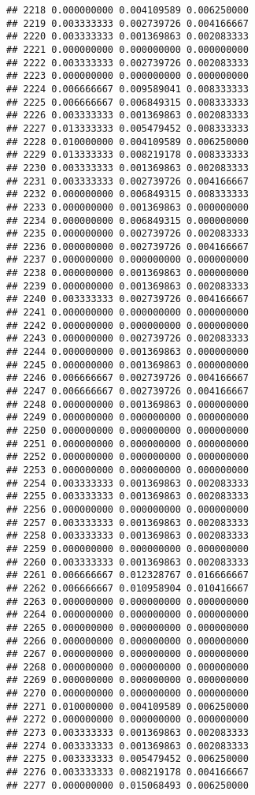 \documentclass[
]{article}
\begin{document}
\begin{verbatim}
## 2218 0.000000000 0.004109589 0.006250000
## 2219 0.003333333 0.002739726 0.004166667
## 2220 0.003333333 0.001369863 0.002083333
## 2221 0.000000000 0.000000000 0.000000000
## 2222 0.003333333 0.002739726 0.002083333
## 2223 0.000000000 0.000000000 0.000000000
## 2224 0.006666667 0.009589041 0.008333333
## 2225 0.006666667 0.006849315 0.008333333
## 2226 0.003333333 0.001369863 0.002083333
## 2227 0.013333333 0.005479452 0.008333333
## 2228 0.010000000 0.004109589 0.006250000
## 2229 0.013333333 0.008219178 0.008333333
## 2230 0.003333333 0.001369863 0.002083333
## 2231 0.003333333 0.002739726 0.004166667
## 2232 0.000000000 0.006849315 0.008333333
## 2233 0.000000000 0.001369863 0.000000000
## 2234 0.000000000 0.006849315 0.000000000
## 2235 0.000000000 0.002739726 0.002083333
## 2236 0.000000000 0.002739726 0.004166667
## 2237 0.000000000 0.000000000 0.000000000
## 2238 0.000000000 0.001369863 0.000000000
## 2239 0.000000000 0.001369863 0.002083333
## 2240 0.003333333 0.002739726 0.004166667
## 2241 0.000000000 0.000000000 0.000000000
## 2242 0.000000000 0.000000000 0.000000000
## 2243 0.000000000 0.002739726 0.002083333
## 2244 0.000000000 0.001369863 0.000000000
## 2245 0.000000000 0.001369863 0.000000000
## 2246 0.006666667 0.002739726 0.004166667
## 2247 0.006666667 0.002739726 0.004166667
## 2248 0.000000000 0.001369863 0.000000000
## 2249 0.000000000 0.000000000 0.000000000
## 2250 0.000000000 0.000000000 0.000000000
## 2251 0.000000000 0.000000000 0.000000000
## 2252 0.000000000 0.000000000 0.000000000
## 2253 0.000000000 0.000000000 0.000000000
## 2254 0.003333333 0.001369863 0.002083333
## 2255 0.003333333 0.001369863 0.002083333
## 2256 0.000000000 0.000000000 0.000000000
## 2257 0.003333333 0.001369863 0.002083333
## 2258 0.003333333 0.001369863 0.002083333
## 2259 0.000000000 0.000000000 0.000000000
## 2260 0.003333333 0.001369863 0.002083333
## 2261 0.006666667 0.012328767 0.016666667
## 2262 0.006666667 0.010958904 0.010416667
## 2263 0.000000000 0.000000000 0.000000000
## 2264 0.000000000 0.000000000 0.000000000
## 2265 0.000000000 0.000000000 0.000000000
## 2266 0.000000000 0.000000000 0.000000000
## 2267 0.000000000 0.000000000 0.000000000
## 2268 0.000000000 0.000000000 0.000000000
## 2269 0.000000000 0.000000000 0.000000000
## 2270 0.000000000 0.000000000 0.000000000
## 2271 0.010000000 0.004109589 0.006250000
## 2272 0.000000000 0.000000000 0.000000000
## 2273 0.003333333 0.001369863 0.002083333
## 2274 0.003333333 0.001369863 0.002083333
## 2275 0.003333333 0.005479452 0.006250000
## 2276 0.003333333 0.008219178 0.004166667
## 2277 0.000000000 0.015068493 0.006250000

\end{verbatim}
\end{document}
